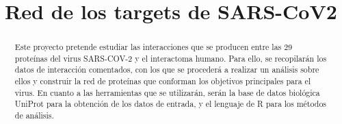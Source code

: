\documentclass{bmcart}
\begin{document}
	\begin{frontmatter}
	
		\begin{fmbox}
						
			
			\title{Red de los targets de SARS-CoV2}
			
			
			\author[
			  addressref={aff1},
			  corref={aff1},
			  email={ireero99@uma.es}
			]{ }
			\author[
			  addressref={aff1},
			  corref={aff1},
			  email={paulandujar@uma.es}
			]{ }
			\author[
			addressref={aff1},
			corref={aff1},
			email={0619884107@uma.es}
			]{ }
			\author[
			addressref={aff1},
			corref={aff1},
			email={delcastillosoledad@uma.es}
			]{ }
			
			
			\address[id=aff1]{%
			  ,             %
			  ,          %
			  ,                              %
			}
		
		\end{fmbox}%
		
		\begin{abstractbox}
		
			\begin{abstract} %
			Este proyecto pretende estudiar las interacciones que se producen entre las 29 proteínas del virus SARS-COV-2 y el interactoma humano. Para ello, se recopilarán los datos de interacción comentados, con los que se procederá a realizar un análisis sobre ellos y construir la red de proteínas que conforman los objetivos principales para el virus. En cuanto a las herramientas que se utilizarán, serán la base de datos biológica UniProt para la obtención de los datos de entrada, y el lenguaje de R para los métodos de análisis.
			
			\end{abstract}
			
			
			\begin{keyword}
			\end{keyword}
		
		
		\end{abstractbox}
	
	\end{frontmatter}
	
\end{document}

